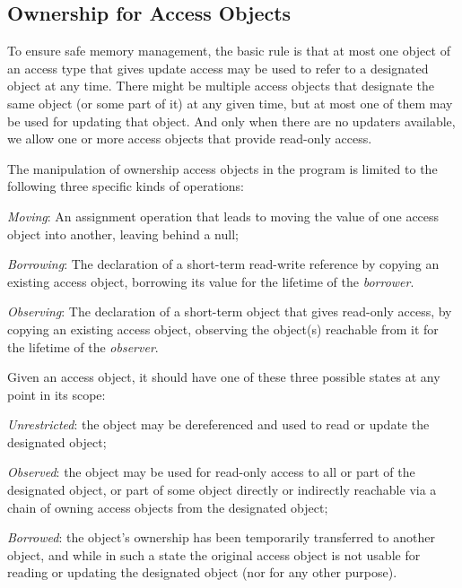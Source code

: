 \documentclass{llncs}
\begin{document}
\subsection{Ownership for Access Objects}
\label{subsec:ownershipAccess}

To ensure safe memory management, the basic rule is that at most one object of an access type that gives update access may be used to refer to a designated object at any time.  There might be multiple access objects that designate the same object (or some part of it) at any given time, but at most one of them may be used for updating that object.  And only when there are no updaters available, we allow one or more access objects that provide read-only access.


The manipulation of ownership access objects in the program is limited to the following three specific kinds of operations:

\begin{compactitem}
  \item \textit{Moving}: An assignment operation that leads to moving the value of one access object into another, leaving behind a null;
  \item \textit{Borrowing}: The declaration of a short-term read-write reference by copying an existing access object, borrowing its value for the lifetime of the \textit{borrower}. 
  \item \textit{Observing}: The declaration of a short-term object that gives read-only access, by copying an existing access object, observing the object(s) reachable from it for the lifetime of the \textit{observer}. 
\end{compactitem}

Given an access object, it should have one of these three possible states at any point in its scope:

\begin{compactitem} 
  \item \textit {Unrestricted}: the object may be dereferenced and used to read or update the designated object;
  \item \textit {Observed}: the object may be used for read-only access to all or part of the designated object, or part of some object directly or indirectly reachable via a chain of owning access objects from the designated object;
  \item \textit {Borrowed}: the object's ownership has been temporarily transferred to another object,  and while in such a state the original access object is not usable for reading or updating the designated object (nor for any other purpose).
\end{compactitem}
\end{document}
